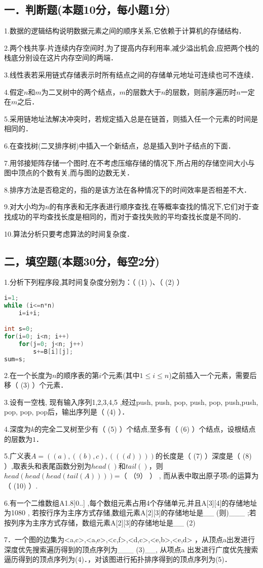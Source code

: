 
\subsection{一．判断题(本题10分，每小题1分)}

1.数据的逻辑结构说明数据元素之间的顺序关系,它依赖于计算机的存储结构．

2.两个栈共享-片连续内存空间时,为了提高内存利用率,减少溢出机会,应把两个栈的栈底分别设在这片内存空间的两端．

3.线性表若采用链式存储表示时所有结点之间的存储单元地址可连续也可不连续．

4.假定$n$和$m$为二叉树中的两个结点，$m$的层数大于$n$的层数，则前序遍历时$n$一定在$m$之后．

5.采用链地址法解决冲突时，若规定插入总是在链首，则插入任一个元素的时间是相同的．

6.在查找树(二叉排序树)中插入一个新结点，总是插入到叶子结点的下面．

7.用邻接矩阵存储一个图时,在不考虑压缩存储的情况下,所占用的存储空间大小与图中顶点的个数有关,而与图的边数无关．

8.排序方法是否稳定的，指的是该方法在各种情况下的时间效率是否相差不大．

9.对大小均为$n$的有序表和无序表进行顺序查找,在等概率查找的情况下,它们对于查找成功的平均查找长度是相同的，而对于查找失败的平均查找长度是不同的．

10.算法分析只要考虑算法的时间复杂度．

\subsection{二，填空题(本题30分，每空2分)}

1.分析下列程序段,其时间复杂度分别为：（ (1) )、（ (2) ）
\begin{lstlisting}[language=cpp]
i=1;
while (i<=n*n)
    i=i+i;

int s=0;
for(i=0; i<n; i++)
    for(j=0; j<n; j++)
        s+=B[i][j];
sum=s;
\end{lstlisting}

2.在一个长度为$n$的顺序表的第$i$个元素(其中$1\leqslant i\leqslant n$)之前插入一个元素，需要后移（ (3) ）个元素．

3.设有一空栈, 现有输入序列1,2,3,4,5 ,经过push, push, pop, push, pop, push,push, pop, pop, pop后，输出序列是（ (4) ）．

4.深度为$k$的完全二叉树至少有（ (5) ）个结点,至多有（ (6) ）个结点，设根结点的层数为$1$．

5.广义表$A=((a),((b),c),(((d))))$的长度是（ (7) ）深度是（ (8) ）,取表头和表尾函数分别为$head()$和$tail()$，则$head(head(head(tail(A))))$=（ （9） ） , 而从表中取出原子项$c$的运算为（ (10)  ）.

6.有一个二维数组A1.8]0..] ,每个数组元素占用4个存储单元,并且A[3][4]的存储地址为1080 , 若按行序为主序方式存储,数组元素A[2][3]的存储地址是__ (则)___ ;若按列序为主序方式存储，数组元素A[2][3]的存储地址是__ (2)

7．一个图的边集为{<a,c>,<a,e>,<c,f>,<d,c>,<e,b>,<e,d>} ，从顶点a出发进行深度优先搜索遍历得到的顶点序列为___ (3)__, 从项点a 出发进行广度优先搜索逼历得到的顶点序列为(4)．，对该图进行拓扑排序得到的顶点序列为(5)．
